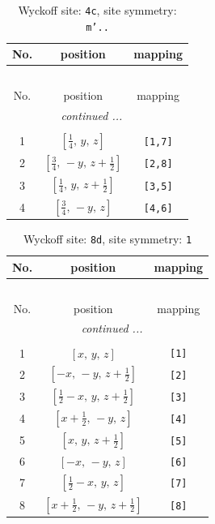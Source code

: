 \documentclass[fleqn,8pt]{jsarticle}
\begin{document}
\renewcommand{\arraystretch}{1.2}
\begin{longtable}{ccc}
\caption{Wyckoff site: {\tt 4c}, site symmetry: {\tt m'..}}
 \\
 \hline \hline
No. & position & mapping \\ \hline \endfirsthead

\multicolumn{2}{l}{\tablename\ \thetable{}} \\
 \hline \hline
No. & position & mapping \\ \hline \endhead

 \hline \hline
\multicolumn{2}{r}{\footnotesize\it continued ...} \\ \endfoot

 \hline \hline
\multicolumn{2}{r}{} \\ \endlastfoot

1 & $\left[ \frac{1}{4},\, y,\, z \right]$ & {\tt [1,7]} \\ \hline
2 & $\left[ \frac{3}{4},\, - y,\, z + \frac{1}{2} \right]$ & {\tt [2,8]} \\ \hline
3 & $\left[ \frac{1}{4},\, y,\, z + \frac{1}{2} \right]$ & {\tt [3,5]} \\ \hline
4 & $\left[ \frac{3}{4},\, - y,\, z \right]$ & {\tt [4,6]} \\
\end{longtable}
\renewcommand{\arraystretch}{1.2}
\begin{longtable}{ccc}
\caption{Wyckoff site: {\tt 8d}, site symmetry: {\tt 1}}
 \\
 \hline \hline
No. & position & mapping \\ \hline \endfirsthead

\multicolumn{2}{l}{\tablename\ \thetable{}} \\
 \hline \hline
No. & position & mapping \\ \hline \endhead

 \hline \hline
\multicolumn{2}{r}{\footnotesize\it continued ...} \\ \endfoot

 \hline \hline
\multicolumn{2}{r}{} \\ \endlastfoot

1 & $\left[ x,\, y,\, z \right]$ & {\tt [1]} \\ \hline
2 & $\left[ - x,\, - y,\, z + \frac{1}{2} \right]$ & {\tt [2]} \\ \hline
3 & $\left[ \frac{1}{2} - x,\, y,\, z + \frac{1}{2} \right]$ & {\tt [3]} \\ \hline
4 & $\left[ x + \frac{1}{2},\, - y,\, z \right]$ & {\tt [4]} \\ \hline
5 & $\left[ x,\, y,\, z + \frac{1}{2} \right]$ & {\tt [5]} \\ \hline
6 & $\left[ - x,\, - y,\, z \right]$ & {\tt [6]} \\ \hline
7 & $\left[ \frac{1}{2} - x,\, y,\, z \right]$ & {\tt [7]} \\ \hline
8 & $\left[ x + \frac{1}{2},\, - y,\, z + \frac{1}{2} \right]$ & {\tt [8]} \\
\end{longtable}
\end{document}
